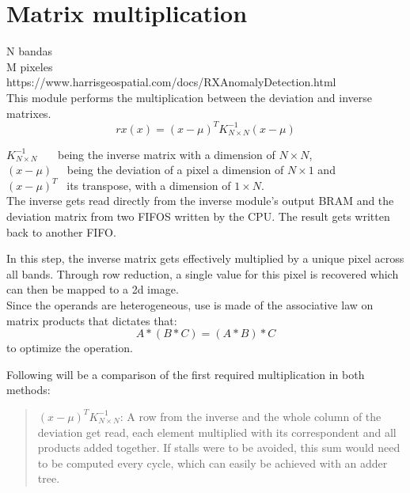 \section{Matrix multiplication}

N bandas\\
M pixeles\\
https://www.harrisgeospatial.com/docs/RXAnomalyDetection.html\\

\noindent This module performs the multiplication between the deviation and inverse matrixes.
\[ rx(x) = (x-\mu)^{T} K^{-1}_{N \times N} (x-\mu) \]


\indent \(K^{-1}_{N \times N}\) \ \ \ being the inverse matrix with a dimension of \(N \times N\),\\
\indent \((x-\mu)\) \ \	being the deviation of a pixel a dimension of \(N \times 1\) and \\			
\indent \((x-\mu)^{T}\) \ its transpose, with a dimension of \(1 \times N\).\\

The inverse gets read directly from the inverse module's output BRAM and the deviation matrix from two  FIFOS written by the CPU. The result gets written back to another FIFO.

In this step, the inverse matrix gets effectively multiplied by a unique pixel across all bands. Through row reduction, a single value for this pixel is recovered which can then be mapped to a 2d image.\\

Since the operands are heterogeneous, use is made of the associative law on matrix products that dictates that:
	\[A * (B * C) = (A * B) * C\]
	to optimize the operation.\\


\newcommand\rb{\colorbox{red!20}}
\newcommand\bb{\colorbox{blue!20}}
\newcommand\gb{\colorbox{green!20}}
\newcommand\rr{\rowcolor{red!20}}
\newcommand\br{\rowcolor{blue!20}}
\newcommand\gr{\rowcolor{green!20}}

\noindent Following will be a comparison of the first required multiplication in both methods:
\begin{quote}
	\((x-\mu)^{T} K^{-1}_{N \times N}\):	
	A row from the inverse and the whole column of the deviation get read, each element multiplied with its correspondent and all products added together. If stalls were to be avoided, this sum would need to be computed every cycle, which can easily be achieved with an adder tree.
\end{quote}


